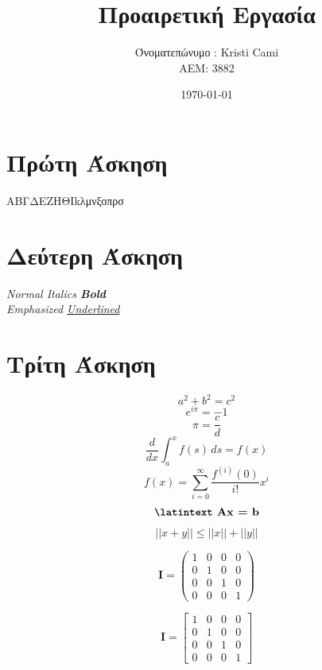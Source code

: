 \documentclass[a4paper,11pt]{article}
\title{Προαιρετική Εργασία}
\author{Όνοματεπώνυμο : \lt Kristi Cami \\ ΑΕΜ: 3882}
\date{\today}
\newcommand{\lt}{\latintext}
\begin{document}
    \maketitle
    \section{Πρώτη Άσκηση}
        \begin{center}
            {\tiny A}{\scriptsize Β}{\footnotesize Γ}{\small Δ}{\normalsize Ε}{\large Ζ}{\Large Η}{\LARGE Θ}{\huge I}{\Huge k}{\LARGE λ}{\Large μ}{\large ν}{\normalsize ξ}{\small ο}{\footnotesize π}{\scriptsize ρ}{\tiny σ}
        \end{center}
    \section{Δεύτερη Άσκηση}
        \begin{center}
            \textit {\lt Normal Italics \textbf{Bold} \\ Emphasized \underline{Underlined} }
        \end{center}
    \section{Τρίτη Άσκηση}
    
        \vspace{15mm} 
    
        \[ a^2 + b^2 = c^2 \]
        \[ e^{i \pi} = -1 \]
        \[ \pi = \frac{c}{d} \]
        \[ \frac{d}{dx}\int_{a}^{x} f(s)\,ds = f(x)\]
        \[ f(x) = \sum_{i=0}^{\infty} \frac{f^{(i)}(0)}{i!}x^i \]
        \[ \textbf{\lt Ax = b} \] 
        \[ ||x+y|| \le ||x||+||y|| \]
        
        \newpage
        
        \begin{equation}
        \textbf{I}=
            \begin{pmatrix}
                1 & 0 & 0 & 0\\
                0 & 1 & 0 & 0\\
                0 & 0 & 1 & 0\\
                0 & 0 & 0 & 1
            \end{pmatrix}
        \end{equation}
        
        \vspace{5mm} 
    
        \begin{equation}
            \textbf{I}=
                \begin{bmatrix}
                    1 & 0 & 0 & 0\\
                    0 & 1 & 0 & 0\\
                    0 & 0 & 1 & 0\\
                    0 & 0 & 0 & 1
                \end{bmatrix}
        \end{equation}
        
\end{document}
